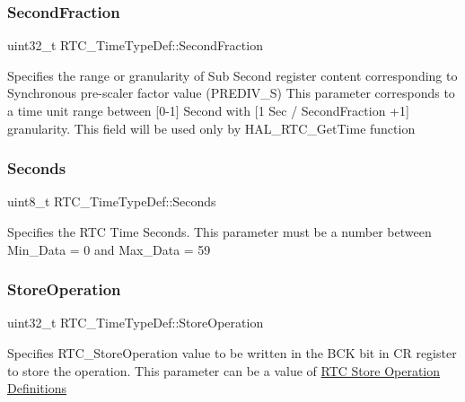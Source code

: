 \subsubsection{\texorpdfstring{Second\+Fraction}{SecondFraction}}
{\footnotesize\ttfamily uint32\+\_\+t R\+T\+C\+\_\+\+Time\+Type\+Def\+::\+Second\+Fraction}

Specifies the range or granularity of Sub Second register content corresponding to Synchronous pre-\/scaler factor value (P\+R\+E\+D\+I\+V\+\_\+S) This parameter corresponds to a time unit range between \mbox{[}0-\/1\mbox{]} Second with \mbox{[}1 Sec / Second\+Fraction +1\mbox{]} granularity. This field will be used only by H\+A\+L\+\_\+\+R\+T\+C\+\_\+\+Get\+Time function \mbox{\label{struct_r_t_c___time_type_def_a297ae76c2b7de4f939d996d93240c6b2}} 
\subsubsection{\texorpdfstring{Seconds}{Seconds}}
{\footnotesize\ttfamily uint8\+\_\+t R\+T\+C\+\_\+\+Time\+Type\+Def\+::\+Seconds}

Specifies the R\+TC Time Seconds. This parameter must be a number between Min\+\_\+\+Data = 0 and Max\+\_\+\+Data = 59 \mbox{\label{struct_r_t_c___time_type_def_a7628b757d7c7a4ab30b6bbc45a028b7d}} 
\subsubsection{\texorpdfstring{Store\+Operation}{StoreOperation}}
{\footnotesize\ttfamily uint32\+\_\+t R\+T\+C\+\_\+\+Time\+Type\+Def\+::\+Store\+Operation}

Specifies R\+T\+C\+\_\+\+Store\+Operation value to be written in the B\+CK bit in CR register to store the operation. This parameter can be a value of \hyperlink{group___r_t_c___store_operation___definitions}{R\+TC Store Operation Definitions} \mbox{\label{struct_r_t_c___time_type_def_ae24e60a3b9549fd02b00ad6762ae5b77}} 
